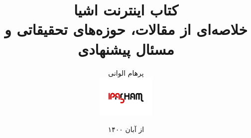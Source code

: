 \title{
  کتاب اینترنت اشیا\\
  \vspace{5mm}
  \small{خلاصه‌ای از مقالات، حوزه‌های تحقیقاتی و مسئال پیشنهادی}
}
\author{
  پرهام الوانی\\
  \includegraphics[height=2cm]{./img/logo.png}
}
\date{از آبان ۱۴۰۰}
\maketitle
